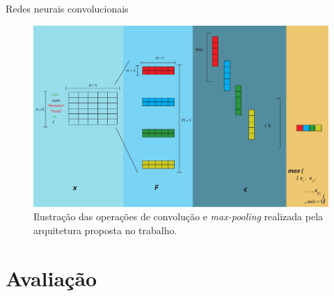 \documentclass[10pt]{beamer}
\begin{document}
\begin{frame}{Redes neurais convolucionais}
   \begin{figure}[h]
        \centering
        \includegraphics[width=1\linewidth]{figuras/cnn-steps-word-embedding-article.pdf}
        \caption{Ilustração das operações de convolução e \textit{max-pooling} realizada pela arquitetura proposta no trabalho. }
        \label{fig:convolution-steps}
    \end{figure}
\end{frame}






\section{Avaliação}
\end{document}
